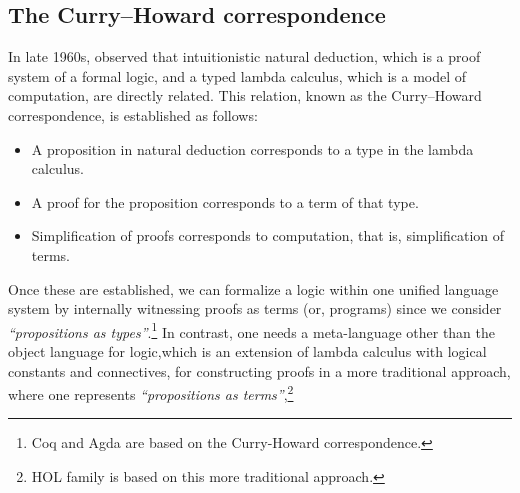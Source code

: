 \subsection{The Curry--Howard correspondence}
In late 1960s, \citet{Howard69} observed that intuitionistic natural deduction,
which is a proof system of a formal logic, and a typed lambda calculus,
which is a model of computation, are directly related. This relation,
known as the Curry--Howard correspondence, is established as follows:
\begin{itemize}
\item A proposition in natural deduction corresponds to
        a type in the lambda calculus.
\item A proof for the proposition corresponds to
        a term of that type.
\item Simplification of proofs corresponds to computation,
        that is, simplification of terms.
\end{itemize}
Once these are established, we can formalize a logic within
one unified language system by internally witnessing proofs as terms
(or, programs) since we consider \emph{``propositions as types''}.\footnote{
	Coq and Agda are based on the Curry-Howard correspondence.}
In contrast, one needs a meta-language other than the object language for logic,which is an extension of lambda calculus with logical constants and connectives,
for constructing proofs in a more traditional approach, where one represents
\emph{``propositions as terms''},\footnote{
	HOL family is based on this more traditional approach.}

